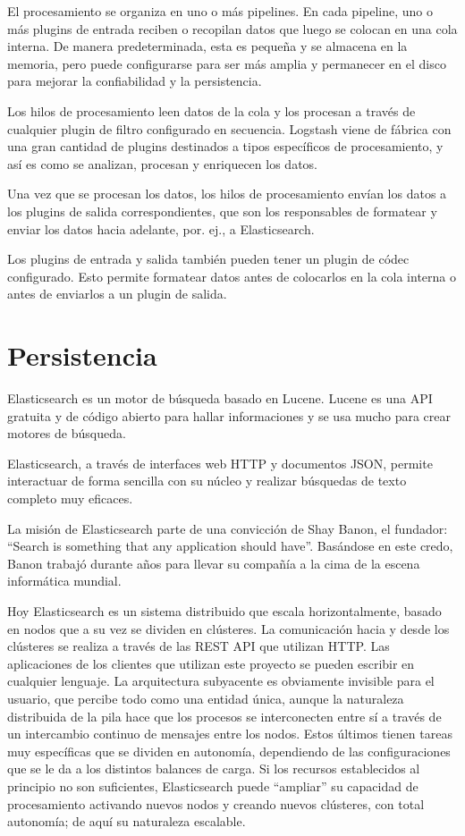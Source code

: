 El procesamiento se organiza en uno o más pipelines. En cada pipeline, uno o más plugins de entrada reciben o recopilan datos que luego se colocan en una cola interna. De manera predeterminada, esta es pequeña y se almacena en la memoria, pero puede configurarse para ser más amplia y permanecer en el disco para mejorar la confiabilidad y la persistencia.

Los hilos de procesamiento leen datos de la cola y los procesan a través de cualquier plugin de filtro configurado en secuencia. Logstash viene de fábrica con una gran cantidad de plugins destinados a tipos específicos de procesamiento, y así es como se analizan, procesan y enriquecen los datos.

Una vez que se procesan los datos, los hilos de procesamiento envían los datos a los plugins de salida correspondientes, que son los responsables de formatear y enviar los datos hacia adelante, por. ej., a Elasticsearch.

Los plugins de entrada y salida también pueden tener un plugin de códec configurado. Esto permite formatear datos antes de colocarlos en la cola interna o antes de enviarlos a un plugin de salida.


\section{Persistencia}
Elasticsearch es un motor de búsqueda basado en Lucene. Lucene es una API gratuita y de código abierto para hallar informaciones y se usa mucho para crear motores de búsqueda.

Elasticsearch, a través de interfaces web HTTP y documentos JSON, permite interactuar de forma sencilla con su núcleo y realizar búsquedas de texto completo muy eficaces.

La misión de Elasticsearch parte de una convicción de Shay Banon, el fundador: “Search is something that any application should have”. Basándose en este credo, Banon trabajó durante años para llevar su compañía a la cima de la escena informática mundial.

Hoy Elasticsearch es un sistema distribuido que escala horizontalmente, basado en nodos que a su vez se dividen en clústeres. La comunicación hacia y desde los clústeres se realiza a través de las REST API que utilizan HTTP. Las aplicaciones de los clientes que utilizan este proyecto se pueden escribir en cualquier lenguaje. La arquitectura subyacente es obviamente invisible para el usuario, que percibe todo como una entidad única, aunque la naturaleza distribuida de la pila hace que los procesos se interconecten entre sí a través de un intercambio continuo de mensajes entre los nodos. Estos últimos tienen tareas muy específicas que se dividen en autonomía, dependiendo de las configuraciones que se le da a los distintos balances de carga. Si los recursos establecidos al principio no son suficientes, Elasticsearch puede “ampliar” su capacidad de procesamiento activando nuevos nodos y creando nuevos clústeres, con total autonomía; de aquí su naturaleza escalable.
 
